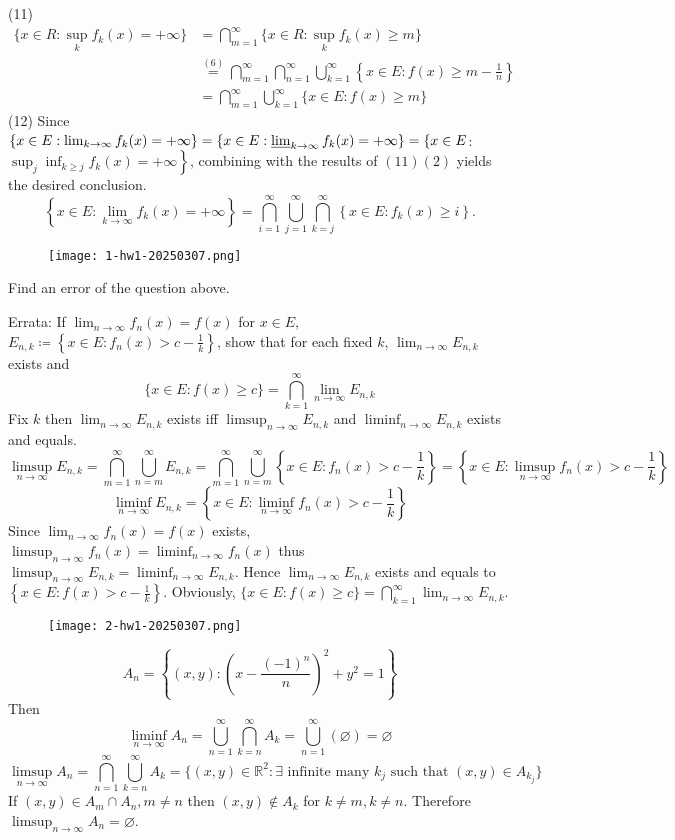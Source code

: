 (11)
\[
\begin{aligned}
\{ x\in R:\sup _kf_k(x)=+\infty \} & =\bigcap_{m=1}^{\infty} \{ x\in R:\sup _kf_k(x)\geq m \} \\
 & \overset{ (6) }{ = }\bigcap_{m=1}^{\infty} \bigcap_{n=1}^{\infty} \bigcup_{k=1}^{\infty} \left\{  x\in E:f(x)\geq m-\frac{1}{n}  \right\} \\
 & =\bigcap_{m=1}^{\infty} \bigcup_{k=1}^{\infty} \{ x\in E:f(x)\geq m \}
\end{aligned}
\]
(12) Since $\left\{x \in E: \lim _{k \rightarrow \infty} f_k(x)=+\infty\right\}=\left\{x \in E: \varliminf_{k \rightarrow \infty} f_k(x)=+\infty\right\}=\{x \in E$: $\left.\sup _j \inf _{k \geqslant j} f_k(x)=+\infty\right\}$, combining with the results of $(11)(2)$ yields the desired conclusion.
\[
\left\{x \in E: \lim _{k \rightarrow \infty} f_k(x)=+\infty\right\}=\bigcap_{i=1}^{\infty} \bigcup_{j=1}^{\infty} \bigcap_{k=j}^{\infty}\left\{x \in E: f_k(x) \geqslant i\right\} .
\]
\begin{figure}[H]
\centering
\texttt{[image: 1-hw1-20250307.png]}
\label{}
\end{figure}
Find an error of the question above.

Errata:
If $\lim_{ n \to \infty }f_n(x)=f(x)$ for $x\in E$, $E_{n,k}\coloneqq \left\{  x\in E:f_n(x)>c-\frac{1}{k}  \right\}$, show that for each fixed $k$, $\lim_{ n \to \infty }E_{n,k}$ exists and
\[
\{ x\in E:f(x)\geq c \}=\bigcap_{k=1}^{\infty}\lim_{ n \to \infty } E_{n,k}
\]
Fix $k$ then $\lim_{ n \to \infty }E_{n,k}$ exists iff $\limsup_{ n \to \infty }E_{n,k}$ and $\liminf_{ n \to \infty }E_{n,k}$ exists and equals.
\[
\limsup_{ n \to \infty } E_{n,k}=\bigcap_{m=1}^{\infty}\bigcup_{n=m}^{\infty} E_{n,k}= \bigcap_{m=1}^{\infty}\bigcup_{n=m}^{\infty} \left\{  x\in E:f_n(x)>c-\frac{1}{k}  \right\}=\left\{  x\in E:\limsup_{ n \to \infty } f_n(x)>c-\frac{1}{k}  \right\}
\]
\[
\liminf_{ n \to \infty } E_{n,k}=\left\{  x\in E:\liminf_{ n \to \infty } f_n(x)>c-\frac{1}{k}  \right\}
\]
Since $\lim_{ n \to \infty }f_n(x)=f(x)$ exists, $\limsup_{ n \to \infty }f_n(x)=\liminf_{ n \to \infty }f_n(x)$ thus $\limsup_{ n \to \infty }E_{n,k}=\liminf_{ n \to \infty }E_{n,k}$. Hence $\lim_{ n \to \infty }E_{n,k}$ exists and equals to $\left\{   x\in E:f(x)>c-\frac{1}{k}  \right\}$. Obviously, $\{ x\in E:f(x)\geq c \}=\bigcap_{k=1}^{\infty}\lim_{ n \to \infty }E_{n,k}$.

\begin{figure}[H]
\centering
\texttt{[image: 2-hw1-20250307.png]}
\label{}
\end{figure}
\[
A_n=\left\{  (x,y):\left( x-\frac{(-1)^{n}}{n} \right)^{2}+y^{2}= 1  \right\}
\]
Then
\[
\liminf_{ n \to \infty } A_n=\bigcup_{n=1}^{\infty} \bigcap_{k=n}^{\infty}A_k=\bigcup_{n=1}^{\infty} (\varnothing)=\varnothing
\]
\[
\limsup_{ n \to \infty } A_n=\bigcap_{n=1}^{\infty} \bigcup_{k=n}^{\infty} A_k=\{ (x,y)\in \mathbb{R}^{2}: \exists \text{ infinite many }k_j\text{ such that } (x,y)\in A_{k_j}\}
\]
If $(x, y)\in A_m\cap A_n,m\neq n$ then $(x, y)\not\in A_k$ for $k\neq m,k\neq n$. Therefore $\limsup_{ n \to \infty }A_n=\varnothing$.

